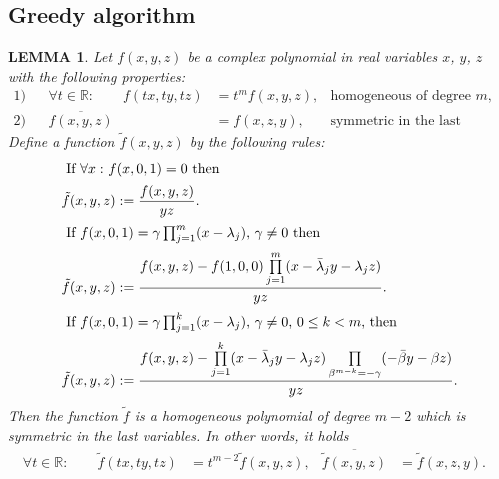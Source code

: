 \documentclass[10pt,a4paper,reqno]{amsart}
\newtheorem{lm}[defi]{\bf L\scriptsize EMMA \normalsize}
\newenvironment{lemma}{\begin{lm}\it}{\end{lm}}
\newcommand{\zav}[1]{\left( #1 \right)}
\newcommand{\tr}{{\rm tr}\,}
\begin{document}
\subsection{Greedy algorithm}
\begin{lemma}\label{greedyalglemma}
Let $f(x,y,z)$ be a complex polynomial in real variables $x$, $y$, $z$ with the following properties:
\begin{align*}
1)& & \forall t\in\mathbb{R}:\qquad f(tx,ty,tz)&=t^{m}f(x,y,z), & \text{homogeneous of degree $m$,}\\
2)& & \overline{f(x,y,z)}&=f(x,z,y), & \text{symmetric in the last variables.}
\end{align*}
Define a function $\tilde f(x,y,z)$ by the following rules:
\begin{align}
	\intertext{ If $\forall x:$ $f(x,0,1)= 0$ then} 
		\tilde f(x,y,z)&:=\frac{f(x,y,z)}{yz}.\\
	\intertext{ If $f(x,0,1)=\gamma \prod_{j=1}^m(x- \lambda_j) $, $\gamma\not=0$ then}
	\label{Lemmamcase}
	\tilde f(x,y,z)&:=\frac{f(x,y,z)-f(1,0,0)\prod\limits_{j=1}^m(x-\bar\lambda_j y-\lambda_j z)}{yz}.\\
	\intertext{ If $f(x,0,1)=\gamma\prod_{j=1}^k(x-\lambda_j)$, $\gamma\not=0$, $0\leq k<m$, then}
	\label{Lemmakcase}
	\tilde f(x,y,z)&:=\frac{f(x,y,z)-\prod\limits_{j=1}^k(x-\bar\lambda_j y-\lambda_j z)\prod\limits_{\beta^{m-k}=-\gamma}(-\bar\beta y-\beta z)}{yz}.	
	\end{align}
Then the function $\tilde f$ is a homogeneous polynomial of degree $m-2$ which is symmetric in the  last variables. In other words, it holds
\begin{align*}
 \forall t\in\mathbb{R}:\qquad \tilde f(tx,ty,tz)&=t^{m-2}\tilde f(x,y,z), &
 \overline{\tilde f(x,y,z)}&=\tilde f(x,z,y). & 
\end{align*}
\end{lemma}
\end{document}
